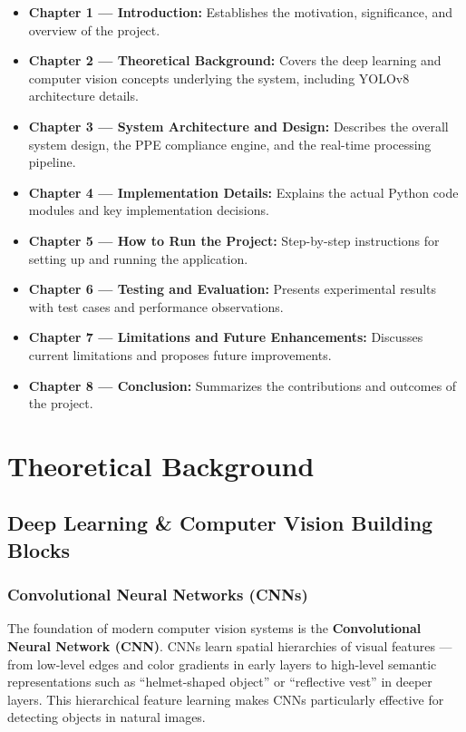\documentclass[12pt,a4paper]{report}
\begin{document}
\begin{itemize}
    \item \textbf{Chapter 1 — Introduction:} Establishes the motivation, significance, and overview of the project.
    \item \textbf{Chapter 2 — Theoretical Background:} Covers the deep learning and computer vision concepts underlying the system, including YOLOv8 architecture details.
    \item \textbf{Chapter 3 — System Architecture and Design:} Describes the overall system design, the PPE compliance engine, and the real-time processing pipeline.
    \item \textbf{Chapter 4 — Implementation Details:} Explains the actual Python code modules and key implementation decisions.
    \item \textbf{Chapter 5 — How to Run the Project:} Step-by-step instructions for setting up and running the application.
    \item \textbf{Chapter 6 — Testing and Evaluation:} Presents experimental results with test cases and performance observations.
    \item \textbf{Chapter 7 — Limitations and Future Enhancements:} Discusses current limitations and proposes future improvements.
    \item \textbf{Chapter 8 — Conclusion:} Summarizes the contributions and outcomes of the project.
\end{itemize}

\chapter{Theoretical Background}

\section{Deep Learning \& Computer Vision Building Blocks}

\subsection*{Convolutional Neural Networks (CNNs)}
The foundation of modern computer vision systems is the \textbf{Convolutional Neural Network (CNN)}. CNNs learn spatial hierarchies of visual features — from low-level edges and color gradients in early layers to high-level semantic representations such as ``helmet-shaped object'' or ``reflective vest'' in deeper layers. This hierarchical feature learning makes CNNs particularly effective for detecting objects in natural images.
\end{document}

